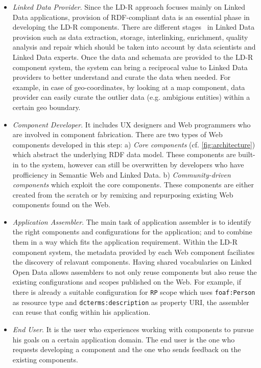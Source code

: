 \documentclass{acm_proc_article-sp}
\begin{document}
\begin{itemize}

\item \emph{Linked Data Provider}.
Since the LD-R approach focuses mainly on Linked Data applications, provision of RDF-compliant data is an essential phase in developing the LD-R components.
There are different stages~\cite{AuerLOD2} in Linked Data provision such as data extraction, storage, interlinking, enrichment, quality analysis and repair which should be taken into account by data scientists and Linked Data experts.
Once the data and schemata are provided to the LD-R component system, the system can bring a reciprocal value to Linked Data providers to better understand and curate the data when needed.
For example, in case of geo-coordinates, by looking at a map component, data provider can easily curate the outlier data (e.g. ambigious entities) within a certain geo boundary.

\item \emph{Component Developer}. 
It includes UX designers and Web programmers who are involved in component fabrication.
There are two types of Web components developed in this step:
a) \emph{Core components} (cf. \autoref{fig:architecture}) which abstract the underlying RDF data model.
These components are built-in to the system, however can still be overwritten by developers who have profficiency in Semantic Web and Linked Data.
b) \emph{Community-driven components} which exploit the core components.
These components are either created from the scratch or by remixing and repurposing existing Web components found on the Web.

\item \emph{Application Assembler}.
The main task of application assembler is to identify the right components and configurations for the application; and to combine them in a way which fits the application requirement. 
Within the LD-R component system, the metadata provided by each Web component faciliates the discovery of relavant components.
Having shared vocabularies on Linked Open Data allows assemblers to not only reuse components but also reuse the existing configurations and scopes published on the Web.
For example, if there is already a suitable configuration for \texttt{RP} scope which uses \texttt{foaf:Person} as resource type and \texttt{dcterms:description} as property URI, the assembler can reuse that config within his application.

\item \emph{End User}. 
It is the user who experiences working with components to pursue his goals on a certain application domain.
The end user is the one who requests developing a component and the one who sends feedback on the existing components.

\end{itemize}
\end{document}
